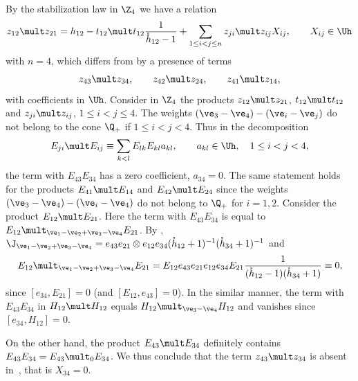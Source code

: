 \documentclass[11pt]{article}
\def\nplus{\mathfrak{n}}\def\nn{\nonumber}\def\nin{\noindent}
\def\s{z}\def\S{\mathrm {S}}\def\si{\sigma}\def\Sp{\S^{\nplus}}\def\sy{\acute{\sigma}}\def\th{\mathring{h}}
\numberwithin{equation}{section}
\begin{document}
By the stabilization law in $\Z_4$ we have a relation
\begin{gather} \label{proof23}
\s_{12}\mult \s_{21}= h_{12}-t_{12}\mult t_{12}  \frac{1}{\th_{12}-1}
+\sum_{1\leq i<j\leq n}\s_{ji}\mult\s_{ij}X_{ij} ,\qquad X_{ij}\in\Uh
\end{gather}
with $n=4$, which dif\/fers from  by a presence of terms
\begin{gather*}\s_{43}\mult\s_{34} ,\qquad \s_{42}\mult\s_{24} ,\qquad \s_{41}\mult\s_{14} ,
\end{gather*}
with coef\/f\/icients in $\Uh$. Consider in $\Z_4$ the products  $\s_{12}\mult\s_{21}$, $t_{12}\mult t_{12}$
and $\s_{ji}\mult\s_{ij}$, $1\leq i<j\leq 4$. The weights $(\ve_3-\ve_4)-(\ve_i-\ve_j)$ do not belong
to the cone $\Q_+$ if $1\leq i<j<4$. Thus in the decomposition
\begin{gather*}
E_{ji}\mult E_{ij}\equiv \sum_{k<l}E_{lk}E_{kl}a_{kl} ,\qquad a_{kl}\in\Uh ,\quad 1\leq i<j<4 ,
\end{gather*}
the term with $E_{43}E_{34}$ has a zero coef\/f\/icient, $a_{34}=0$. The same statement holds for the products
$E_{41}\mult E_{14}$ and $E_{42}\mult E_{24}$ since the weights $(\ve_3-\ve_4)-(\ve_i-\ve_4)$ do
not belong to $\Q_+$ for $i=1,2$. Consider the product $E_{12}\mult E_{21}$. Here the term with
$E_{43}E_{34}$ is equal to $E_{12}\mult_{\ve_1-\ve_2+\ve_3-\ve_4}E_{21}$. By ,
$\J_{\ve_1-\ve_2+\ve_3-\ve_4}=e_{43}e_{21}\otimes e_{12}e_{34}(\th_{12}+1)^{-1}(\th_{34}+1)^{-1}$ and
\begin{gather*}E_{12}\mult_{\ve_1-\ve_2+\ve_3-\ve_4}E_{21}=
E_{12}e_{43}e_{21}e_{12}e_{34}E_{21} \frac{1}{(\th_{12}-1)(\th_{34}+1)}\equiv 0,\end{gather*}
since $[e_{34},E_{21}]=0$ (and $[E_{12},e_{43}]=0$). In the similar manner, the term with
$E_{43}E_{34}$ in $H_{12}\mult H_{12}$ equals $H_{12}\mult_{\ve_3-\ve_4}H_{12}$ and vanishes
since $[e_{34},H_{12}]=0$.

On the other hand, the product $E_{43}\mult E_{34}$
def\/initely contains $E_{43}E_{34}=E_{43}\mult_0 E_{34}$. We thus conclude that the term
$\s_{43}\mult \s_{34}$ is absent in~, that is $X_{34}=0$.
\end{document}
